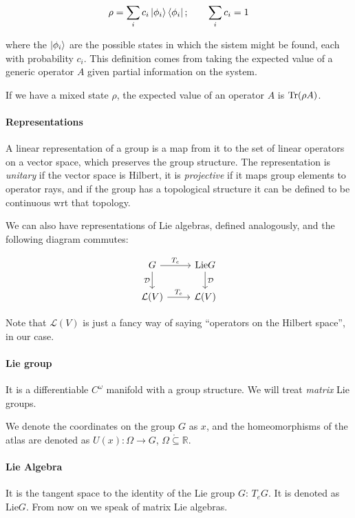 \documentclass[main.tex]{subfiles}
\begin{document}
\begin{equation}
\rho = \sum_i c_i \ket{\phi_i} \bra{\phi_i}; \qquad \sum_i c_i = 1
\end{equation}

where the $\ket{\phi_i}$ are the possible states in which the sistem might be found, each with probability $c_i$. This definition comes from taking the expected value of a generic operator $A$ given partial information on the system.

If we have a mixed state $\rho$, the expected value of an operator $A$ is $\Tr(\rho A)$.

\paragraph{Representations} A linear representation of a group is a map from it to the set of linear operators on a vector space, which preserves the group structure. The representation is \emph{unitary} if the vector space is Hilbert, it is \emph{projective} if it maps group elements to operator rays, and if the group has a topological structure it can be defined to be continuous wrt that topology.

We can also have representations of Lie algebras, defined analogously, and the following diagram commutes:

\[
\begin{tikzcd}
G \arrow{r}{T_e} \arrow[swap]{d}{\mathcal{D}} & \text{Lie}G \arrow{d}{\mathcal{D}} \\%
\mathcal{L}(V) \arrow{r}{T_e}& \mathcal{L}(V)
\end{tikzcd}
\]

Note that $\mathcal{L}(V)$ is just a fancy way of saying ``operators on the Hilbert space'', in our case.

\paragraph{Lie group} It is a differentiable $C^\omega$ manifold with a group structure. We will treat \emph{matrix} Lie groups.

We denote the coordinates on the group $G$ as $x$, and the homeomorphisms of the atlas are denoted as $U(x): \Omega \rightarrow G$, $\Omega \mathring{\subseteq} \mathbb{R}$.

\paragraph{Lie Algebra} It is the tangent space to the identity of the Lie group $G$: $T_e G$. It is denoted as $\text{Lie}G$. From now on we speak of matrix Lie algebras.
\end{document}
